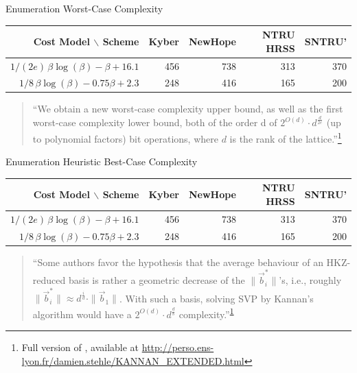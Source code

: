 \documentclass[xcolor=table,10pt,aspectratio=169]{beamer}
\def\enumworstfit{\(1/(2e)\, \beta \log(\beta) - \beta + 16.1\)}
\def\enumavgfit{\(1/8\,\beta \log(\beta) - 0.75\beta + 2.3\)}
\def\rogr{\rowcolor{gray!20}}
\begin{document}
\begin{frame}[label={sec:orgac696a5}]{Enumeration Worst-Case Complexity}
\begin{center}
\small{
\begin{tabular}{rrrrr}
\textbf{Cost Model} $\backslash$    \textbf{Scheme} & \textbf{Kyber} & \textbf{NewHope} & \textbf{NTRU HRSS} & \textbf{SNTRU'}\\
\hline
\rogr \enumworstfit & 456 & 738 & 313 & 370\\
\enumavgfit & 248 & 416 & 165 & 200\\
\end{tabular}
}
\end{center}

\begin{quote}
“We obtain a new worst-case complexity upper bound, as well as the first worst-case complexity lower
bound, both of the order d of \(2^{O(d)} \cdot d^{\frac{d}{2e}}\) (up to polynomial factors) bit
operations, where \(d\) is the rank of the lattice.”\footnote{Full version of , available at \url{http://perso.ens-lyon.fr/damien.stehle/KANNAN\_EXTENDED.html}\label{org3d77782}}
\end{quote}
\end{frame}

\begin{frame}[label={sec:orgeecbcb0}]{Enumeration Heuristic Best-Case Complexity}
\begin{center}
\small{
\begin{tabular}{rrrrr}
\textbf{Cost Model} $\backslash$    \textbf{Scheme} & \textbf{Kyber} & \textbf{NewHope} & \textbf{NTRU HRSS} & \textbf{SNTRU'}\\
\hline
\enumworstfit & 456 & 738 & 313 & 370\\
\rogr \enumavgfit & 248 & 416 & 165 & 200\\
\end{tabular}
}
\end{center}

\begin{quote}
“Some authors favor the hypothesis that the average behaviour of an HKZ-reduced basis is rather a geometric decrease of the \(\|\vec{b}_i^{*}\|\)’s, i.e., roughly \(\|\vec{b}^*_i\| ≈ d^{\frac{i}{d}} \cdot \|\vec{b}_1\|\). With such a basis, solving SVP by Kannan’s algorithm would have a \(2^{O(d)} \cdot d^{\frac{d}{8}}\) complexity.”\textsuperscript{\ref{org3d77782}}
\end{quote}
\end{frame}
\end{document}
